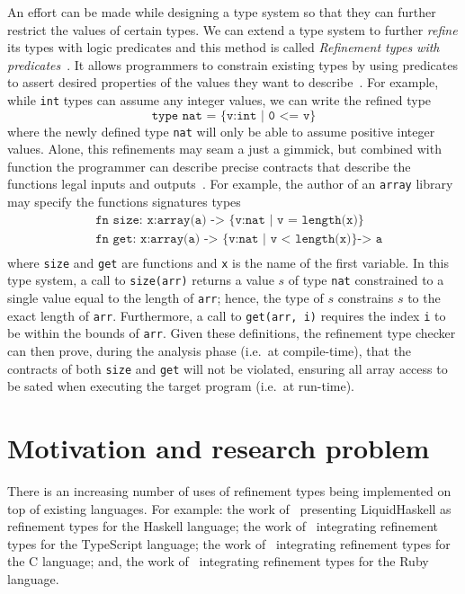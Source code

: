 \documentclass[
  oneside,
  english,
  coorientadorbanca,
  embeddedlogo,
  noabntexcite
]{ufsc-thesis-rn46-2019}
\newcommand{\code}[1]{\texttt{#1}}
\begin{document}
An effort can be made while designing a type system so that they can further restrict the values of certain types.
We can extend a type system to further \textit{refine} its types with logic predicates and this method is called \textit{Refinement types with predicates}~\cite{jhala2020tutorial}.
It allows programmers to constrain existing types by using predicates to assert desired properties of the values they want to describe~\cite{jhala2020tutorial}.
For example, while \code{int} types can assume any integer values, we can write the refined type
\begin{equation*}
  \code{type nat = \{v:int | 0 <= v\}}
\end{equation*}
where the newly defined type \code{nat} will only be able to assume positive integer values.
Alone, this refinements may seam a just a gimmick, but combined with function the programmer can describe precise contracts that describe the functions legal inputs and outputs~\cite{jhala2020tutorial}.
For example, the author of an \code{array} library may specify the functions signatures types
\begin{equation*}
  \begin{aligned}
     & \code{fn size: x:array(a) -> \{v:nat | v = length(x)\}}      \\
     & \code{fn  get: x:array(a) -> \{v:nat | v < length(x)\} -> a} \\
  \end{aligned}
\end{equation*}
where \code{size} and \code{get} are functions and \code{x} is the name of the first variable.
In this type system, a call to \code{size(arr)} returns a value $s$ of type \code{nat} constrained to a single value equal to the length of \code{arr}; hence, the type of $s$ constrains $s$ to the exact length of \code{arr}.
Furthermore, a call to \code{get(arr, i)} requires the index \code{i} to be within the bounds of \code{arr}.
Given these definitions, the refinement type checker can then prove, during the analysis phase (i.e.\ at compile-time), that the contracts of both \code{size} and \code{get} will not be violated, ensuring all array access to be sated when executing the target program (i.e.\ at run-time).

\section{Motivation and research problem}

There is an increasing number of uses of refinement types being implemented on top of existing languages.
For example: the work of~\textcite{vazou2014liquidhaskell} presenting LiquidHaskell as refinement types for the Haskell language; the work of~\textcite{vekris2016refinementtypescript} integrating refinement types for the TypeScript language; the work of~\textcite{sammler2021refinedc} integrating refinement types for the C language; and, the work of~\textcite{vazou2018refinementruby} integrating refinement types for the Ruby language.
\end{document}
